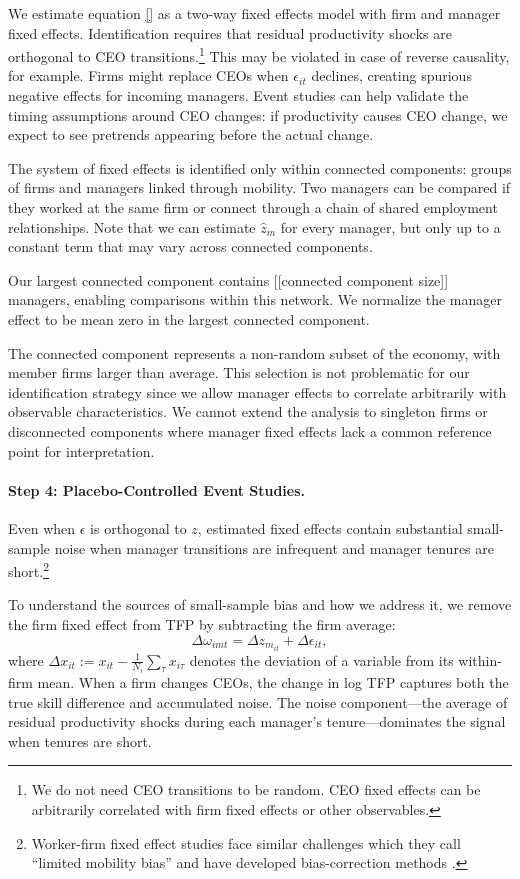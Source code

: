 \documentclass[11pt,a4paper]{article}
\begin{document}
We estimate equation \eqref{} as a two-way fixed effects model with firm and manager fixed effects. Identification requires that residual productivity shocks are orthogonal to CEO transitions.\footnote{We do not need CEO transitions to be random. CEO fixed effects can be arbitrarily correlated with firm fixed effects or other observables.} This may be violated in case of reverse causality, for example. Firms might replace CEOs when $\epsilon_{it}$ declines, creating spurious negative effects for incoming managers. Event studies can help validate the timing assumptions around CEO changes: if productivity causes CEO change, we expect to see pretrends appearing before the actual change. 

The system of fixed effects is identified only within connected components: groups of firms and managers linked through mobility. Two managers can be compared if they worked at the same firm or connect through a chain of shared employment relationships. Note that we can estimate $\hat z_m$ for every manager, but only up to a constant term that may vary across connected components. 


Our largest connected component contains [[connected component size]] managers, enabling comparisons within this network. We normalize the manager effect to be mean zero in the largest connected component.

The connected component represents a non-random subset of the economy, with member firms larger than average. This selection is not problematic for our identification strategy since we allow manager effects to correlate arbitrarily with observable characteristics. We cannot extend the analysis to singleton firms or disconnected components where manager fixed effects lack a common reference point for interpretation.

\paragraph{Step 4: Placebo-Controlled Event Studies.} Even when $\epsilon$ is orthogonal to $z$, estimated fixed effects contain substantial small-sample noise when manager transitions are infrequent and manager tenures are short.\footnote{Worker-firm fixed effect studies face similar challenges which they call ``limited mobility bias'' \citep{andrews2008high} and have developed bias-correction methods \citep{Bonhomme2023-dx, gaure2014correlation}. }

To understand the sources of small-sample bias and how we address it, we remove the firm fixed effect from TFP by subtracting the firm average:
\begin{equation}
\Delta\omega_{imt} = \Delta z_{m_{it}} + \Delta\epsilon_{it},
\end{equation}
where $\Delta x_{it} := x_{it} - \frac{1}{N_i}\sum_{\tau} x_{i\tau}$ denotes the deviation of a variable from its within-firm mean. When a firm changes CEOs, the change in log TFP captures both the true skill difference and accumulated noise. The noise component---the average of residual productivity shocks during each manager's tenure---dominates the signal when tenures are short. 
\end{document}
